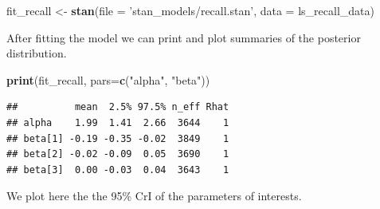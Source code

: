 \documentclass[12pt,]{krantz}
\newenvironment{Shaded}{\begin{snugshade}}{\end{snugshade}}
\newcommand{\DataTypeTok}[1]{\textcolor[rgb]{0.13,0.29,0.53}{#1}}
\newcommand{\DecValTok}[1]{\textcolor[rgb]{0.00,0.00,0.81}{#1}}
\newcommand{\KeywordTok}[1]{\textcolor[rgb]{0.13,0.29,0.53}{\textbf{#1}}}
\newcommand{\NormalTok}[1]{#1}
\newcommand{\OperatorTok}[1]{\textcolor[rgb]{0.81,0.36,0.00}{\textbf{#1}}}
\newcommand{\StringTok}[1]{\textcolor[rgb]{0.31,0.60,0.02}{#1}}
\theoremstyle{definition}
\theoremstyle{definition}
\theoremstyle{definition}
\theoremstyle{remark}
\begin{document}
\begin{Shaded}
\end{Shaded}

\begin{Shaded}
\begin{Highlighting}[]
\NormalTok{fit_recall <-}\StringTok{ }\KeywordTok{stan}\NormalTok{(}\DataTypeTok{file =} \StringTok{'stan_models/recall.stan'}\NormalTok{,}
                   \DataTypeTok{data =}\NormalTok{ ls_recall_data)}
\end{Highlighting}
\end{Shaded}

After fitting the model we can print and plot summaries of the posterior distribution.

\begin{Shaded}
\begin{Highlighting}[]
\KeywordTok{print}\NormalTok{(fit_recall, }\DataTypeTok{pars=}\KeywordTok{c}\NormalTok{(}\StringTok{"alpha"}\NormalTok{, }\StringTok{"beta"}\NormalTok{))}
\end{Highlighting}
\end{Shaded}

\begin{verbatim}
##          mean  2.5% 97.5% n_eff Rhat
## alpha    1.99  1.41  2.66  3644    1
## beta[1] -0.19 -0.35 -0.02  3849    1
## beta[2] -0.02 -0.09  0.05  3690    1
## beta[3]  0.00 -0.03  0.04  3643    1
\end{verbatim}

We plot here the the 95\% CrI of the parameters of interests.
\end{document}
